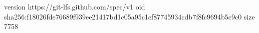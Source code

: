 version https://git-lfs.github.com/spec/v1
oid sha256:f18026fde76689f939ee21417bd1c05a95c1cf87745934cdb7f8fc9694b5c9c0
size 7758
